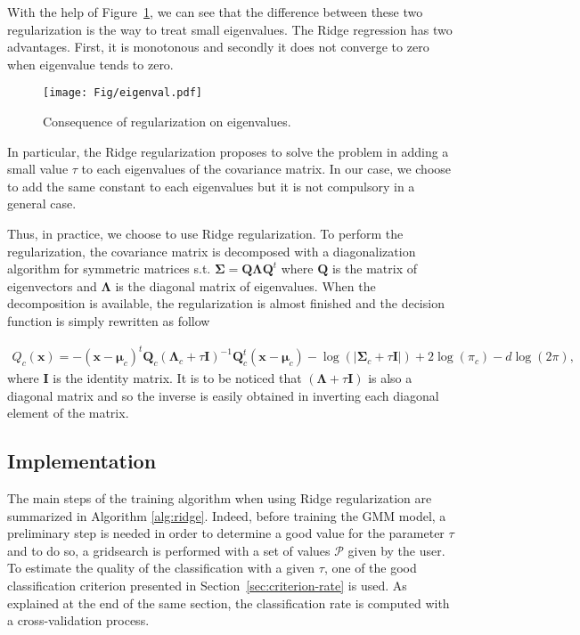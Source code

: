 \documentclass[a4paper,11pt,DIV=16,abstracton]{scrartcl}
\begin{document}
    With the help of Figure~\ref{fig:eigenvalues}, we can see that the difference between these two regularization is the way to treat small eigenvalues. The Ridge regression has two advantages. First, it is monotonous and secondly it does not converge to zero when eigenvalue tends to zero.

    \begin{figure}[!ht]
        \centering
        \texttt{[image: Fig/eigenval.pdf]}
        \caption{Consequence of regularization on eigenvalues.\label{fig:eigenvalues}}
    \end{figure}

    In particular, the Ridge regularization proposes to solve the problem in adding a small value $\tau$ to each eigenvalues of the covariance matrix. In our case, we choose to add the same constant to each eigenvalues but it is not compulsory in a general case.

    Thus, in practice, we choose to use Ridge regularization. To perform the regularization, the covariance matrix is decomposed with a diagonalization algorithm for symmetric matrices s.t. $\boldsymbol{\Sigma} = \mathbf{Q} \boldsymbol{\Lambda} \mathbf{Q}^t$ where $\mathbf{Q}$ is the matrix of eigenvectors and $\boldsymbol{\Lambda}$ is the diagonal matrix of eigenvalues. When the decomposition is available, the regularization is almost finished and the decision function is simply rewritten as follow

    \begin{align}
    \label{eq:decision-ridge}
        Q_c(\mathbf{x}) = - (\mathbf{x} - \boldsymbol{\mu}_c)^t \mathbf{Q}_c (\boldsymbol{\Lambda}_c + \tau \mathbf{I})^{-1} \mathbf{Q}_c^t (\mathbf{x} - \boldsymbol{\mu}_c) - \log (|\boldsymbol{\Sigma}_c + \tau \mathbf{I}|) + 2 \log (\pi_c) - d \log (2\pi),
    \end{align}
    where $\mathbf{I}$ is the identity matrix. It is to be noticed that $(\boldsymbol{\Lambda} + \tau \mathbf{I})$ is also a diagonal matrix and so the inverse is easily obtained in inverting each diagonal element of the matrix.

    \subsection{Implementation}

    The main steps of the training algorithm when using Ridge regularization are summarized in Algorithm \ref{alg:ridge}. Indeed, before training the GMM model, a preliminary step is needed in order to determine a good value for the parameter $\tau$ and to do so, a gridsearch is performed with a set of values $\mathcal{P}$ given by the user. To estimate the quality of the classification with a given $\tau$, one of the good classification criterion presented in Section~\ref{sec:criterion-rate} is used. As explained at the end of the same section, the classification rate is computed with a cross-validation process.
\end{document}
